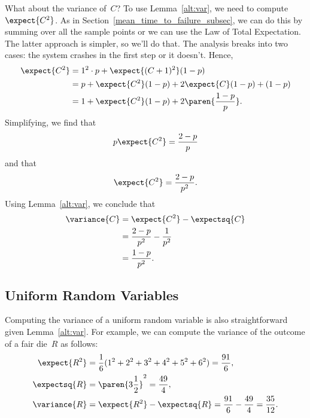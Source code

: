 What about the variance of~$C$?  To use Lemma~\ref{alt:var}, we need
to compute~$\expect{C^2}$.  As in
Section~\ref{mean_time_to_failure_subsec}, we can do this by summing
over all the sample points or we can use the Law of Total
Expectation.  The latter approach is simpler, so we'll do that.  The
analysis breaks into two cases: the system crashes in the first step
or it doesn't.  Hence,
\begin{align*}
\expect{C^2}
    &= 1^2 \cdot p + \expect{(C + 1)^2} (1 - p) \\
    &= p + \expect{C^2} (1 - p) + 2 \expect{C} (1 - p) + (1 - p) \\
    &= 1 + \expect{C^2} (1 - p) + 2 \paren{\frac{1 - p}{p}}.
\end{align*}
Simplifying, we find that
\begin{equation*}
    p \expect{C^2} = \frac{2 - p}{p}
\end{equation*}
and that
\begin{equation*}
    \expect{C^2} = \frac{2 - p}{p^2}.
\end{equation*}
Using Lemma~\ref{alt:var}, we conclude that
\begin{align*}
\variance{C}
    &= \expect{C^2} - \expectsq{C} \\
    &= \frac{2 - p}{p^2} - \frac{1}{p^2} \\
    &= \frac{1 - p}{p^2}.
\end{align*}

\subsection{Uniform Random Variables}

Computing the variance of a uniform random variable is also
straightforward given Lemma~\ref{alt:var}.  For example, we can
compute the variance of the outcome of a fair die~$R$ as follows:
\begin{align*}
\expect{R^2}
    &= \frac{1}{6} (1^2 + 2^2 + 3^2 + 4^2 + 5^2 + 6^2) = \frac{91}{6},\\
\expectsq{R}
    &= \paren{3\frac{1}{2}}^2 = \frac{49}{4}, \\
\variance{R}
    &= \expect{R^2} - \expectsq{R} = \frac{91}{6} - \frac{49}{4}
        = \frac{35}{12}.
\end{align*}

